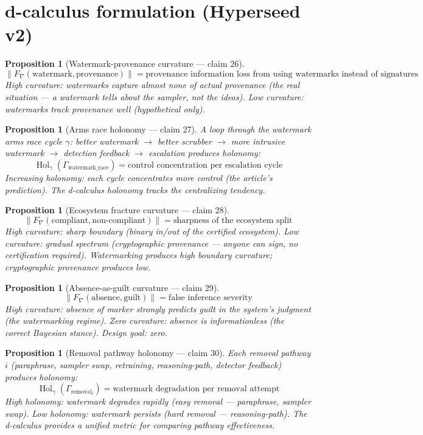 \documentclass[11pt,a4paper]{article}
\newtheorem{proposition}[definition]{Proposition}
\begin{document}
\section{d-calculus formulation (Hyperseed v2)}

\begin{proposition}[Watermark-provenance curvature --- claim 26]
\label{prop:wp_curv}
\[
  \|F_\nabla(\text{watermark}, \text{provenance})\| = \text{provenance
    information loss from using watermarks instead of signatures}
\]
High curvature: watermarks capture almost none of actual provenance (the
real situation --- a watermark tells about the sampler, not the ideas).
Low curvature: watermarks track provenance well (hypothetical only).
\end{proposition}

\begin{proposition}[Arms race holonomy --- claim 27]
\label{prop:race_hol}
A loop through the watermark arms race cycle $\gamma$: better watermark
$\to$ better scrubber $\to$ more intrusive watermark $\to$ detection
feedback $\to$ escalation produces holonomy:
\[
  \operatorname{Hol}_\gamma(\Gamma_{\text{watermark\_race}}) =
    \text{control concentration per escalation cycle}
\]
Increasing holonomy: each cycle concentrates more control (the article's
prediction). The d-calculus holonomy tracks the centralizing tendency.
\end{proposition}

\begin{proposition}[Ecosystem fracture curvature --- claim 28]
\label{prop:frac_curv}
\[
  \|F_\nabla(\text{compliant}, \text{non-compliant})\| =
    \text{sharpness of the ecosystem split}
\]
High curvature: sharp boundary (binary in/out of the certified ecosystem).
Low curvature: gradual spectrum (cryptographic provenance --- anyone can
sign, no certification required). Watermarking produces high boundary
curvature; cryptographic provenance produces low.
\end{proposition}

\begin{proposition}[Absence-as-guilt curvature --- claim 29]
\label{prop:ag_curv}
\[
  \|F_\nabla(\text{absence}, \text{guilt})\| = \text{false inference severity}
\]
High curvature: absence of marker strongly predicts guilt in the system's
judgment (the watermarking regime). Zero curvature: absence is
informationless (the correct Bayesian stance). Design goal: zero.
\end{proposition}

\begin{proposition}[Removal pathway holonomy --- claim 30]
\label{prop:removal_hol}
Each removal pathway $i$ (paraphrase, sampler swap, retraining,
reasoning-path, detector feedback) produces holonomy:
\[
  \operatorname{Hol}_\gamma(\Gamma_{\text{removal}_i}) =
    \text{watermark degradation per removal attempt}
\]
High holonomy: watermark degrades rapidly (easy removal --- paraphrase,
sampler swap). Low holonomy: watermark persists (hard removal ---
reasoning-path). The d-calculus provides a unified metric for comparing
pathway effectiveness.
\end{proposition}
\end{document}
